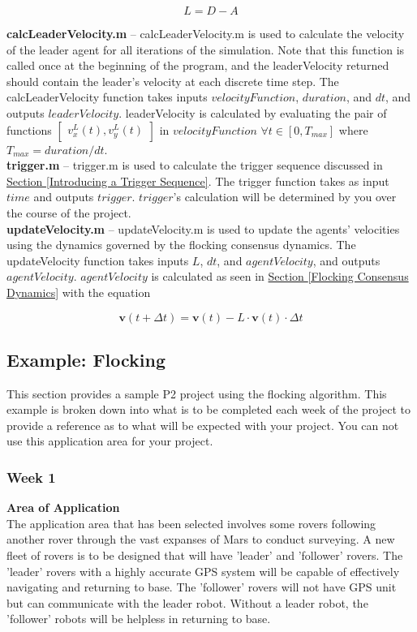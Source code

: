\documentclass[../CourseManual.tex]{subfiles}
\begin{document}
$$L = D - A$$

\textbf{calcLeaderVelocity.m} -- calcLeaderVelocity.m is used to calculate the velocity of the leader agent for all iterations of the simulation. Note that this function is called once at the beginning of the program, and the leaderVelocity returned should contain the leader's velocity at each discrete time step. The calcLeaderVelocity function takes inputs $velocityFunction$, $duration$, and $dt$, and outputs $leaderVelocity$. leaderVelocity is calculated by evaluating the pair of functions $\begin{bmatrix} v^{L}_{x}(t), v^{L}_{y}(t)\end{bmatrix}$ in $velocityFunction$ $\forall t \in [0, T_{max}]$ where $T_{max} = duration/dt$. \\

\textbf{trigger.m} -- trigger.m is used to calculate the trigger sequence discussed in \hyperref[Introducing a Trigger Sequence]{Section \ref{Introducing a Trigger Sequence}}. The trigger function takes as input $time$ and outputs $trigger$. $trigger$'s calculation will be determined by you over the course of the project. \\

\textbf{updateVelocity.m} -- updateVelocity.m is used to update the agents' velocities using the dynamics governed by the flocking consensus dynamics. The updateVelocity function takes inputs $L$, $dt$, and $agentVelocity$, and outputs $agentVelocity$. $agentVelocity$ is calculated as seen in \hyperref[Flocking Consensus Dynamics]{Section \ref{Flocking Consensus Dynamics}} with the equation

$$\boldsymbol{v}(t+\Delta t) = \boldsymbol{v}(t) - L \cdot \boldsymbol{v}(t) \cdot \Delta t$$

\subsection{Example: Flocking} \label{Example: Flocking}
This section provides a sample P2 project using the flocking algorithm. This example is broken down into what is to be completed each week of the project to provide a reference as to what will be expected with your project. You can not use this application area for your project.

\subsubsection{Week 1} \label{Week 1: Flocking}
\textbf{Area of Application}\\
The application area that has been selected involves some rovers following another rover through the vast expanses of Mars to conduct surveying. A new fleet of rovers is to be designed that will have 'leader' and 'follower' rovers. The 'leader' rovers with a highly accurate GPS system will be capable of effectively navigating and returning to base. The 'follower' rovers will not have GPS unit but can communicate with the leader robot. Without a leader robot, the 'follower' robots will be helpless in returning to base.\\
\end{document}
